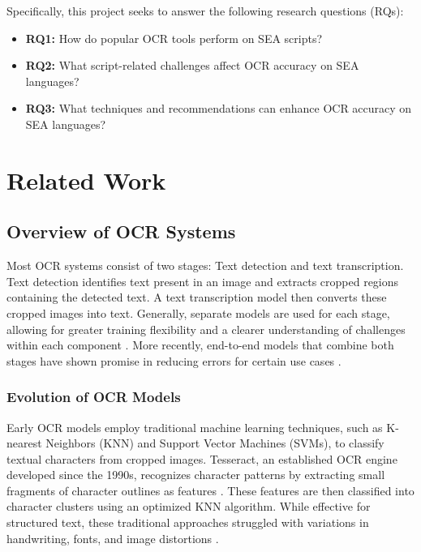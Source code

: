 \documentclass[12pt,oneside]{memoir}
\begin{document}
Specifically, this project seeks to answer the following research questions (RQs):

\begin{itemize}
    \item \textbf{RQ1:} How do popular OCR tools perform on SEA scripts?
    \item \textbf{RQ2:} What script-related challenges affect OCR accuracy on SEA languages?
    \item \textbf{RQ3:} What techniques and recommendations can enhance OCR accuracy on SEA languages?
\end{itemize}

\chapter{Related Work}

\section{Overview of OCR Systems}

Most OCR systems consist of two stages: Text detection and text transcription.
Text detection identifies text present in an image and extracts cropped regions containing the detected text. 
A text transcription model then converts these cropped images into text.
Generally, separate models are used for each stage, allowing for greater training flexibility and a clearer understanding of challenges within each component \parencite{subramani-etal-2023}. 
More recently, end-to-end models that combine both stages have shown promise in reducing errors for certain use cases \parencite{feng-etal-2019}.

\subsection{Evolution of OCR Models}

Early OCR models employ traditional machine learning techniques, such as K-nearest Neighbors (KNN) and Support Vector Machines (SVMs), to classify textual characters from cropped images.
Tesseract, an established OCR engine developed since the 1990s, recognizes character patterns by extracting small fragments of character outlines as features \parencite{smith-2013}.
These features are then classified into character clusters using an optimized KNN algorithm.
While effective for structured text, these traditional approaches struggled with variations in handwriting, fonts, and image distortions \parencite{subramani-etal-2023}.
\end{document}
